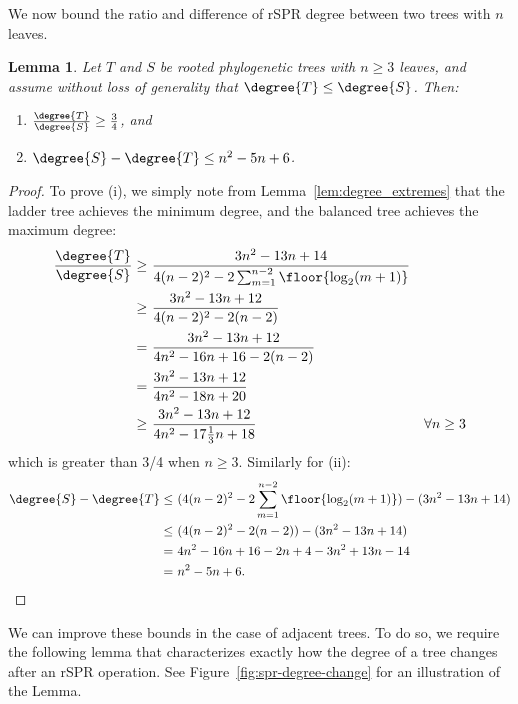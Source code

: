 \documentclass[11pt,onecolumn,conference]{IEEEtran}
\newtheorem{lemma}[theorem]{Lemma}
\newcommand{\cuttable}[1]{#1} %
\begin{document}
We now bound the ratio and difference of rSPR degree between two trees with $n$ leaves.
\begin{lemma}
	\label{lem:degree_max_delta}
	Let $T$ and $S$ be rooted phylogenetic trees with $n \ge 3$ leaves, and assume without loss of generality that $\degree{T} \le \degree{S}$.
	Then:
	\begin{enumerate}
		\item $\frac{\degree{T}}{\degree{S}} \ge \frac{3}{4}$, and
		\item $\degree{S} - \degree{T} \le n^2 - 5n + 6$.
	\end{enumerate}
\end{lemma}
\begin{proof}
	To prove (i), we simply note from Lemma~\ref{lem:degree_extremes} that the ladder tree achieves the minimum degree, and the balanced tree achieves the maximum degree:
	\begin{align*}
		\frac{\degree{T}}{\degree{S}} \ge\ &\frac{3n^2 - 13n + 14}{4(n-2)^2 - 2 \sum_{m=1}^{n-2} \floor{\log_2(m+1)}} \\
		\ge\ &\frac{3n^2 - 13n + 12}{4(n-2)^2 - 2(n-2)} \\
		\cuttable{= \ &\frac{3n^2 - 13n + 12}{4n^2 - 16n + 16 - 2(n-2)} \\}
		= \ &\frac{3n^2 - 13n + 12}{4n^2 - 18n + 20} \\
		\cuttable{\ge\ &\frac{3n^2 - 13n + 12}{4n^2 - 17\frac{1}{3}n + 18} &\forall n \ge 3 \\}
	\end{align*}
	which is greater than 3/4 when $n \ge 3$.
    Similarly for (ii):
	\begin{align*}
		\cuttable{\degree{S} - \degree{T}
		\le\ &(4(n-2)^2 - 2 \sum_{m=1}^{n-2} \floor{\log_2(m+1)})
		- (3n^2 - 13n + 14) \\}
		\le\ &(4(n-2)^2 - 2(n-2)) - (3n^2 - 13n + 14) \\
		\cuttable{=\ &4n^2 - 16n + 16 - 2n +4 - 3n^2 + 13n - 14 \\}
		=\ &n^2 - 5n + 6.
	\end{align*}
\end{proof}

We can improve these bounds in the case of adjacent trees.
To do so, we require the following lemma that characterizes exactly how the degree of a tree changes after an rSPR operation.
See Figure~\ref{fig:spr-degree-change} for an illustration of the Lemma.
\end{document}
